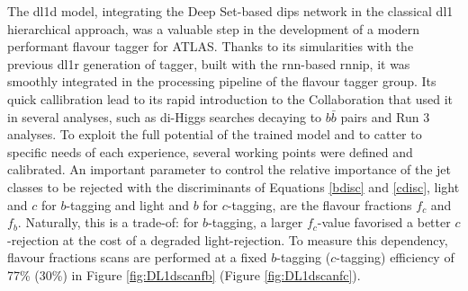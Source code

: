 The \gls{dl1d} model, integrating the Deep Set-based \gls{dips} network in the classical \gls{dl1} hierarchical approach, was a valuable step in the development of a modern performant flavour tagger for ATLAS. Thanks to its simularities with the previous \gls{dl1r} generation of tagger, built with the \gls{rnn}-based \gls{rnnip}, it was smoothly integrated in the processing pipeline of the flavour tagger group. Its quick callibration lead to its rapid introduction to the Collaboration that used it in several analyses, such as di-Higgs searches decaying to $b\bar{b}$ pairs and Run 3 analyses. To exploit the full potential of the trained model and to catter to specific needs of each experience, several working points were defined and calibrated. An important parameter to control the relative importance of the jet classes to be rejected with the discriminants of Equations \ref{bdisc} and \ref{cdisc}, light and $c$ for $b$-tagging and light and $b$ for $c$-tagging, are the flavour fractions $f_c$ and $f_b$. Naturally, this is a trade-of: for $b$-tagging, a larger $f_c$-value favorised a better $c$-rejection at the cost of a degraded light-rejection. To measure this dependency, flavour fractions scans are performed at a fixed $b$-tagging ($c$-tagging) efficiency of 77\% (30\%) in Figure \ref{fig:DL1dscanfb} (Figure \ref{fig:DL1dscanfc}). %

